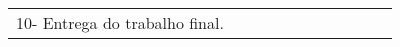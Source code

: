 \begin{frame}
\begin{table}[]
{\begin{tabular}{ccccccccccc}
10- Entrega do trabalho final.                                                                                         &                          &                          &                          &                          &                          &                          &                          &                          &                          & \cellcolor[HTML]{343434}
\end{tabular}}
\end{table}
\end{frame}